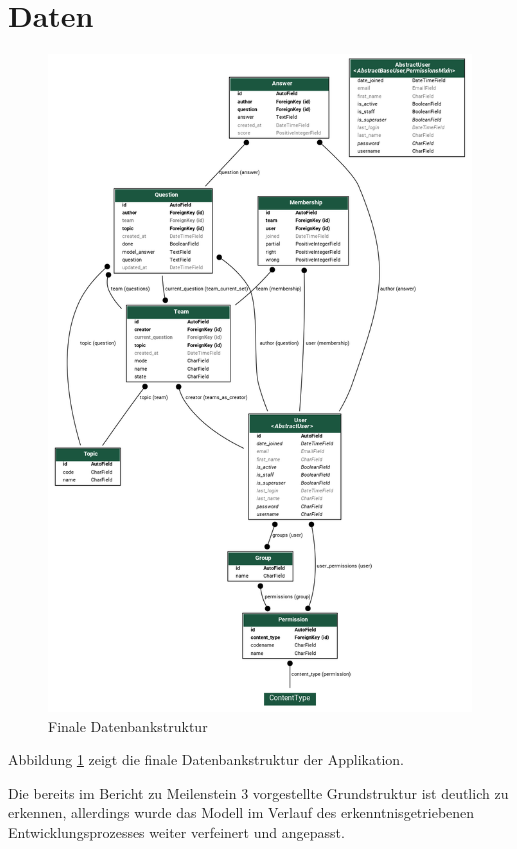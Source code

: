 \documentclass[a4paper,11pt,listof=numbered,glossary=totoc,parskip=half,toc=bib]{scrreprt}
\begin{document}
	
	\section{Daten}
	
	\begin{figure}
		\centering
		\includegraphics[width=\textwidth]{models_final}
		\caption{Finale Datenbankstruktur}
		\label{fig:database}
	\end{figure}

	Abbildung \ref{fig:database} zeigt die finale Datenbankstruktur der Applikation.
	
	Die bereits im Bericht zu Meilenstein 3 vorgestellte Grundstruktur ist deutlich zu erkennen, allerdings wurde das Modell im Verlauf des erkenntnisgetriebenen Entwicklungsprozesses weiter verfeinert und angepasst.
	
\end{document}
